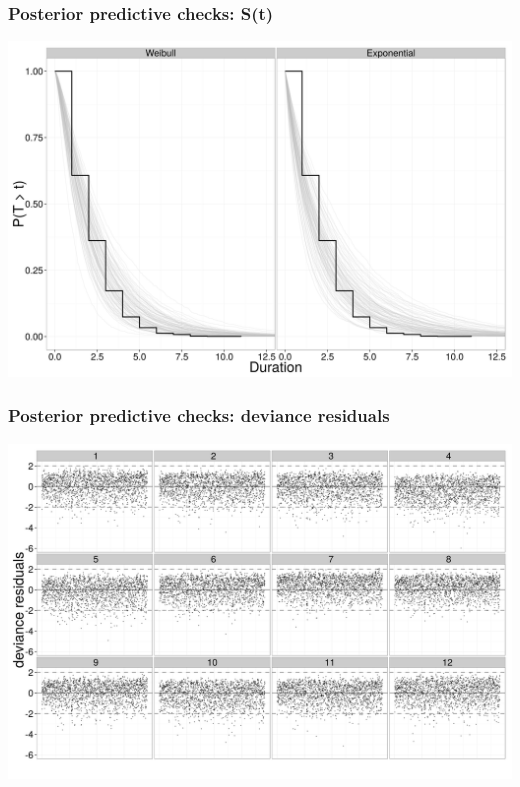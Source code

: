 \documentclass{beamer}
\begin{document}
\begin{frame}
  \frametitle{Posterior predictive checks: S(t)}
  \begin{center}
    \includegraphics[height = 0.8\textheight, width = \textwidth,  keepaspectratio = true]{figure/survival_function}
  \end{center}
\end{frame}

\begin{frame}
  \frametitle{Posterior predictive checks: deviance residuals}
  \begin{center}
    \includegraphics[height = 0.8\textheight, width = \textwidth,  keepaspectratio = true]{figure/residual_plot}
  \end{center}
\end{frame}
\end{document}
